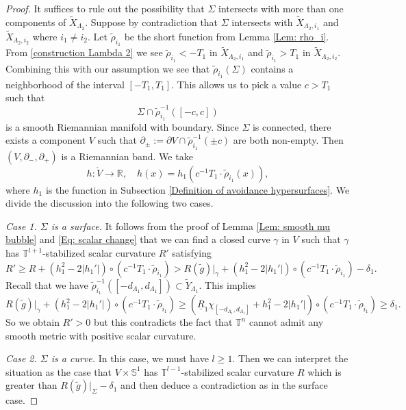 \documentclass[11pt,letterpaper]{amsart}
\numberwithin{equation}{section}
\theoremstyle{definition}
\begin{document}
\begin{proof}
It suffices to rule out the possibility that $\Sigma$ intersects with more than one components of $\tilde X_{\Lambda_2}$. Suppose by contradiction that $\Sigma$ intersects with $\tilde X_{\Lambda_2,i_1}$ and $\tilde X_{\Lambda_2,i_2}$ where $i_1\neq i_2$. Let $\tilde \rho_{i_1}$ be the short function from Lemma \ref{Lem: rho_i}. From \eqref{construction Lambda 2} we see $\tilde \rho_{i_1}<-T_1$ in $\tilde X_{\Lambda_2,i_1}$ and $\tilde \rho_{i_1}>T_1$ in $\tilde X_{\Lambda_2,i_2}$. Combining this with our assumption we see that $\tilde \rho_{i_1}(\Sigma)$ contains a neighborhood of the interval $[-T_1,T_1]$. This allows us to pick a value $c>T_1$ such that
$$
\Sigma\cap \tilde \rho_{i_1}^{-1}([-c,c])
$$
is a smooth Riemannian manifold with boundary. Since $\Sigma$ is connected, there exists a component $V$ such that $\partial_{\pm}:=\partial V\cap\tilde \rho_{i_1}^{-1}(\pm c)$ are both non-empty. Then $(V,\partial_{-},\partial_{+})$ is a Riemannian band. We take
$$
h:\mathring V\to \mathbb R,\quad h(x)=h_1\left(c^{-1}T_1 \cdot \tilde \rho_{i_1}(x)\right),
$$
where $h_{1}$ is the function in Subsection \ref{Definition of avoidance hypersurfaces}. We divide the discussion into the following two cases.

\medskip
{\it Case 1. $\Sigma$ is a surface.} {It follows from the proof of Lemma \ref{Lem: smooth mu bubble} and \eqref{Eq: scalar change} that}
 we can find a closed curve $\gamma$ in $V$ such that $\gamma$ has $\mathbb T^{l+1}$-stabilized scalar curvature $R'$ satisfying
$$
R'\geq R+(h_1^2-2|h_1'|)\circ {(c^{-1}T_1 \cdot \tilde \rho_{i_1})}
> R(\tilde g)|_\gamma+(h_1^2-2|h_1'|)\circ {(c^{-1}T_1 \cdot \tilde \rho_{i_1})}-\delta_1.
$$
Recall that we have $\tilde \rho_{i_1}^{-1}([-d_{\Lambda_1},d_{\Lambda_1}])\subset \tilde Y_{\Lambda_1}$. This implies
$$
R(\tilde g)|_\gamma+(h_1^2-2|h_1'|)\circ {(c^{-1}T_1 \cdot \tilde \rho_{i_1})}
\geq \left(\underline R_1\chi_{[-d_{\Lambda_1},d_{\Lambda_1}]}+h_1^2-2|h_1'|\right)\circ {(c^{-1}T_1 \cdot \tilde \rho_{i_1})} \geq \delta_{1}.
$$
So we obtain $R'>0$ but this contradicts the fact that $\mathbb T^n$ cannot admit any smooth metric with positive scalar curvature.

\medskip
{\it Case 2. $\Sigma$ is a curve.} In this case, we must have $l\geq 1$. Then we can interpret the situation as the case that $V\times \mathbb S^1$ has $\mathbb T^{l-1}$-stabilized scalar curvature $R$ which is greater than ${R(\tilde g)|_\Sigma}-\delta_1$ and then deduce a contradiction as in the surface case.
\end{proof}
\end{document}
